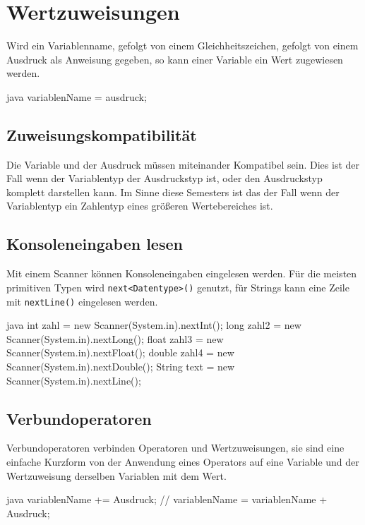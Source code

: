 \documentclass{article}
\begin{document}
\section{Wertzuweisungen}
Wird ein Variablenname, gefolgt von einem Gleichheitszeichen, gefolgt von einem Ausdruck als Anweisung gegeben, so kann einer Variable ein Wert zugewiesen werden.
\begin{slsourcecode}{java}
variablenName = ausdruck;
\end{slsourcecode}

\subsection{Zuweisungskompatibilität}
Die Variable und der Ausdruck müssen miteinander Kompatibel sein. Dies ist der Fall wenn der Variablentyp der Ausdruckstyp ist, oder den Ausdruckstyp komplett darstellen kann. Im Sinne diese Semesters ist das der Fall wenn der Variablentyp ein Zahlentyp eines größeren Wertebereiches ist.

\subsection{Konsoleneingaben lesen}
Mit einem Scanner können Konsoleneingaben eingelesen werden. Für die meisten primitiven Typen wird \texttt{next<Datentype>()} genutzt, für Strings kann eine Zeile mit \texttt{nextLine()} eingelesen werden.
\begin{sourcecode}{java}
int zahl = new Scanner(System.in).nextInt();
long zahl2 = new Scanner(System.in).nextLong();
float zahl3 = new Scanner(System.in).nextFloat();
double zahl4 = new Scanner(System.in).nextDouble();
String text = new Scanner(System.in).nextLine();
\end{sourcecode}

\subsection{Verbundoperatoren}
Verbundoperatoren verbinden Operatoren und Wertzuweisungen, sie sind eine einfache Kurzform von der Anwendung eines Operators auf eine Variable und der Wertzuweisung derselben Variablen mit dem Wert.
\begin{slsourcecode}{java}
variablenName += Ausdruck; // variablenName = variablenName + Ausdruck;
\end{slsourcecode}
\end{document}

